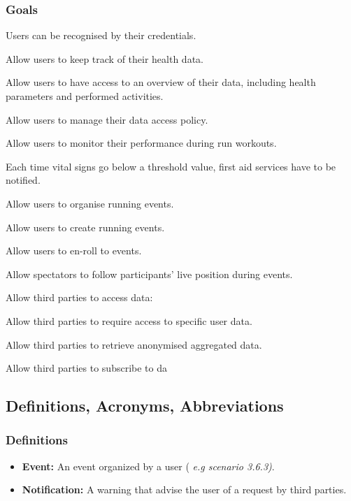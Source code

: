 \documentclass{article}
\begin{document}
\subsubsection{Goals} \label{goals}
\begin{enumerate}[label={\textbf{[G\arabic*]}}]
\item Users can be recognised by their credentials.
\item Allow users to keep track of their health data.
\item Allow users to have access to an overview of their data, including health parameters and performed activities. \label{g3}
\item Allow users to manage their data access policy.
\item Allow users to monitor their performance during run workouts.
\item Each time vital signs go below a threshold value, first aid services have to be notified.
\item Allow users to organise running events.
		\begin{enumerate}[label={[G\arabic{enumi}.\arabic*]}]
    		\item Allow users to create running events.
    		\item Allow users to en-roll to events.
    		\item Allow spectators to follow participants’ live position during events.
  		\end{enumerate}
\item Allow third parties to access data:
		\begin{enumerate}[label={[G\arabic{enumi}.\arabic*]}]
    		\item Allow third parties to require access to specific user data.
    		\item Allow third parties to retrieve anonymised aggregated data.
    		\item Allow third parties to subscribe to da
  		\end{enumerate}

\end{enumerate}

\subsection{Definitions, Acronyms, Abbreviations}

\subsubsection{Definitions}
\begin{itemize}
	\item \textbf{Event:} An event organized by a user (\textit{ e.g scenario 3.6.3)}.
	\item \textbf{Notification:} A warning that advise the user of a request by third parties.
	\end{itemize}
\end{document}
